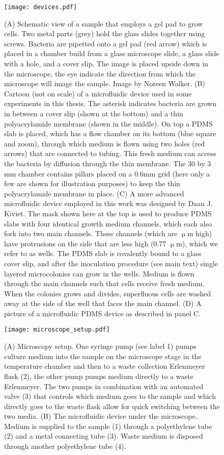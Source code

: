 \begin{figure}
	\centering
	\texttt{[image: devices.pdf]}
	\caption{ 
		(A) Schematic view of a sample that employs a gel pad to grow cells. Two metal parts (grey) hold the glass slides together using screws. Bacteria are pipetted onto a gel pad (red arrow) which is placed in a chamber build from a glass microscope slide, a glass slide with a hole, and a cover slip. The image is placed upside down in the microscope, the eye indicate the direction from which the microscope will image the sample. Image by Noreen Walker.
		(B) Cartoon (not on scale) of a microfluidic device used in some experiments in this thesis. 
		The asterisk indicates bacteria are grown in between a cover slip (shown at the bottom) and a thin polyacrylamide membrane (shown in the middle).
		On top a PDMS slab is placed, which has a flow chamber on its bottom (blue square and zoom), through which medium is flown using two holes (red arrows) that are connected to tubing. 
		This fresh medium can access the bacteria by diffusion through the thin membrane. 
		The 30 by 3 mm chamber contains pillars placed on a 0.6mm grid (here only a few are shown for illustration purposes) to keep the thin polyacrylamide membrane in place. 
		(C) A more advanced microfluidic device employed in this work was designed by Daan J. Kiviet. 
		The mask shown here at the top is used to produce PDMS slabs with four identical growth medium channels, which each also fork into two main channels. 
		These channels (which are  $\upmu$m high) have protrusions on the side that are less high (0.77 $\upmu$m), which we refer to as wells.
		The PDMS slab is covalently bound to a glass cover slip, and after the inoculation procedure (see main text) single layered microcolonies can grow in the wells.
		Medium is flown through the main channels such that cells receive fresh medium. 
		When the colonies grows and divides, superfluous cells are washed away at the side of the well that faces the main channel.		
		(D) A picture of a microfluidic PDMS device as described in panel C.
	}
	\label{fig:mm:devices}
\end{figure}


\begin{figure}
	\centering
	\texttt{[image: microscope\_setup.pdf]}
	\caption{ 
	(A) Microscopy setup. One syringe pump (see label 1) pumps culture medium into the sample on the microscope stage in the temperature chamber and then to a waste collection Erlenmeyer flask (2), the other pump pumps medium directly to a waste Erlenmeyer. The two pumps in combination with an automated valve (3) that controls which medium goes to the sample and which directly goes to the waste flask allow for quick switching between the two media.
	(B) The microfluidic device under the microscope. 
	Medium is supplied to the sample (1) through a polyethylene tube (2) and a metal connecting tube (3). Waste medium is disposed through another polyethylene tube (4).
	}
	\label{fig:mm:microscope_setup}
\end{figure}

